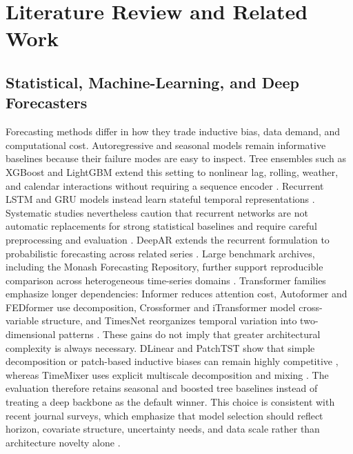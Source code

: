 \documentclass{ieeeaccess}
\begin{document}
\section{Literature Review and Related Work}

\subsection{Statistical, Machine-Learning, and Deep Forecasters}
Forecasting methods differ in how they trade inductive bias, data demand, and
computational cost. Autoregressive and seasonal models remain informative
baselines because their failure modes are easy to inspect. Tree ensembles such
as XGBoost and LightGBM extend this setting to nonlinear lag, rolling, weather,
and calendar interactions without requiring a sequence encoder
\cite{chen2016xgboost,ke2017lightgbm}. Recurrent LSTM and GRU models instead
learn stateful temporal representations \cite{hochreiter1997lstm,cho2014gru}.
Systematic studies nevertheless caution that recurrent networks are not
automatic replacements for strong statistical baselines and require careful
preprocessing and evaluation \cite{hewamalage2021rnn}. DeepAR extends the
recurrent formulation to probabilistic forecasting across related series
\cite{salinas2020deepar}.
Large benchmark archives, including the Monash Forecasting Repository, further
support reproducible comparison across heterogeneous time-series domains
\cite{godahewa2021monash}.
Transformer families emphasize longer dependencies: Informer reduces attention
cost, Autoformer and FEDformer use decomposition, Crossformer and iTransformer
model cross-variable structure, and TimesNet reorganizes temporal variation
into two-dimensional patterns
\cite{zhou2021informer,wu2021autoformer,zhou2022fedformer,zhang2023crossformer,liu2024itransformer,wu2023timesnet}.
These gains do not imply that greater architectural complexity is always
necessary. DLinear and PatchTST show that simple decomposition or patch-based
inductive biases can remain highly competitive \cite{zeng2023dlinear,nie2023patchtst},
whereas TimeMixer uses explicit multiscale decomposition and mixing
\cite{wang2024timemixer}. The evaluation therefore retains seasonal and boosted
tree baselines instead of treating a deep backbone as the default winner. This
choice is consistent with recent journal surveys, which emphasize that model
selection should reflect horizon, covariate structure, uncertainty needs, and
data scale rather than architecture novelty alone
\cite{lim2021survey,benidis2023deepforecasting}.
\end{document}
